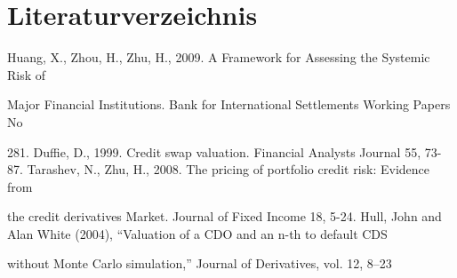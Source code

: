\documentclass[a4paper,12pt]{scrartcl}
\begin{document}
\section{Literaturverzeichnis}

Huang, X., Zhou, H., Zhu, H., 2009. A Framework for Assessing the Systemic Risk of

Major Financial Institutions. Bank for International Settlements Working Papers  No

281.
\newline
\newline
Duffie, D., 1999. Credit swap valuation. Financial Analysts Journal 55, 73-87.
\newline
\newline
Tarashev, N., Zhu, H., 2008. The pricing of portfolio credit risk: Evidence from

the credit derivatives Market. Journal of Fixed Income 18, 5-24.
\newline
\newline
Hull, John and Alan White (2004), “Valuation of a CDO and an n-th to default CDS 

without Monte Carlo simulation,” Journal of Derivatives, vol. 12, 8–23
\end{document}
